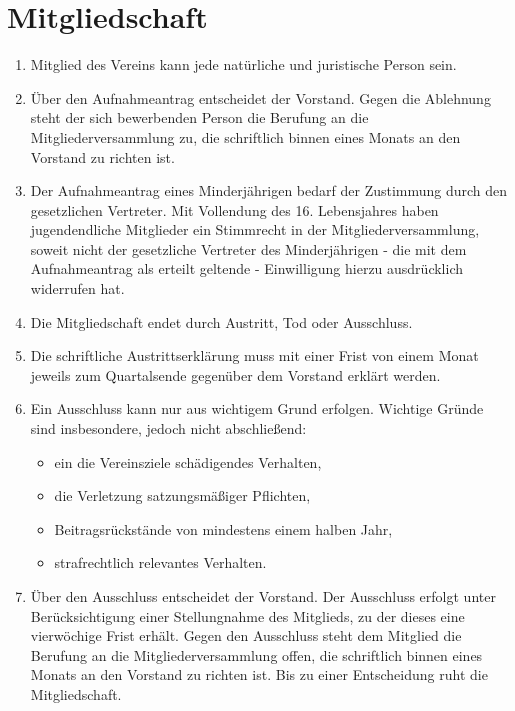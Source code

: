 \documentclass[10pt,conference,a4paper,nofonttune]{IEEEtran}
\begin{document}
\section{Mitgliedschaft}
\begin{enumerate}
  \item Mitglied des Vereins kann jede natürliche und juristische Person sein.

  \item Über den Aufnahmeantrag entscheidet der Vorstand. Gegen die Ablehnung
    steht der sich bewerbenden Person die Berufung an die Mitgliederversammlung
    zu, die schriftlich binnen eines Monats an den Vorstand zu richten ist.

  \item Der Aufnahmeantrag eines Minderjährigen bedarf der Zustimmung durch den
    gesetzlichen Vertreter. Mit Vollendung des 16. Lebensjahres haben
    jugendendliche Mitglieder ein Stimmrecht in der Mitgliederversammlung,
    soweit nicht der gesetzliche Vertreter des Minderjährigen - die mit dem
    Aufnahmeantrag als erteilt geltende - Einwilligung hierzu ausdrücklich
    widerrufen hat.

  \item Die Mitgliedschaft endet durch Austritt, Tod oder Ausschluss.

  \item Die schriftliche Austrittserklärung muss mit einer Frist von einem Monat
    jeweils zum Quartalsende gegenüber dem Vorstand erklärt werden.

  \item Ein Ausschluss kann nur aus wichtigem Grund erfolgen. Wichtige Gründe
    sind insbesondere, jedoch nicht abschließend:
    \begin{itemize}
      \item ein die Vereinsziele schädigendes Verhalten,

      \item die Verletzung satzungsmäßiger Pflichten,

      \item Beitragsrückstände von mindestens einem halben Jahr,

      \item strafrechtlich relevantes Verhalten.
    \end{itemize}

  \item Über den Ausschluss entscheidet der Vorstand. Der Ausschluss erfolgt
    unter Berücksichtigung einer Stellungnahme des Mitglieds, zu der dieses eine
    vierwöchige Frist erhält. Gegen den Ausschluss steht dem Mitglied die
    Berufung an die Mitgliederversammlung offen, die schriftlich binnen eines
    Monats an den Vorstand zu richten ist. Bis zu einer Entscheidung ruht die
    Mitgliedschaft.


\end{enumerate}
\end{document}
